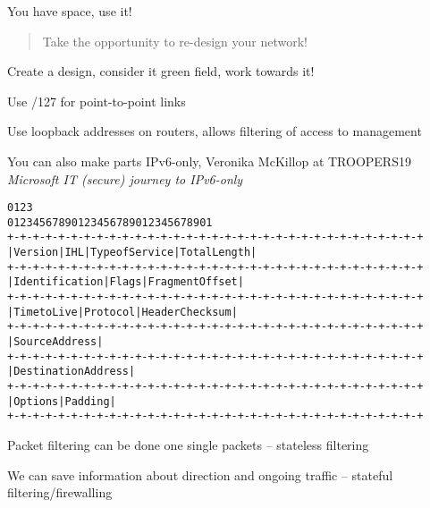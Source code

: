 \documentclass[Screen16to9,17pt]{foils}
\begin{document}
\begin{list2}
\item You have space, use it!
\end{list2}




\begin{quote}
Take the opportunity to re-design your network!
\end{quote}

\begin{list2}
\item Create a design, consider it green field, work towards it!
\item Use /127 for point-to-point links
\item Use loopback addresses on routers, allows filtering of access to management
\item You can also make parts IPv6-only, Veronika McKillop at TROOPERS19 \emph{Microsoft IT (secure) journey to IPv6-only}\\
\end{list2}



\begin{alltt}\footnotesize
0                   1                   2                   3
0 1 2 3 4 5 6 7 8 9 0 1 2 3 4 5 6 7 8 9 0 1 2 3 4 5 6 7 8 9 0 1
+-+-+-+-+-+-+-+-+-+-+-+-+-+-+-+-+-+-+-+-+-+-+-+-+-+-+-+-+-+-+-+-+
|Version|  IHL  |Type of Service|          Total Length         |
+-+-+-+-+-+-+-+-+-+-+-+-+-+-+-+-+-+-+-+-+-+-+-+-+-+-+-+-+-+-+-+-+
|         Identification        |Flags|      Fragment Offset    |
+-+-+-+-+-+-+-+-+-+-+-+-+-+-+-+-+-+-+-+-+-+-+-+-+-+-+-+-+-+-+-+-+
|  Time to Live |    Protocol   |         Header Checksum       |
+-+-+-+-+-+-+-+-+-+-+-+-+-+-+-+-+-+-+-+-+-+-+-+-+-+-+-+-+-+-+-+-+
|                       Source Address                          |
+-+-+-+-+-+-+-+-+-+-+-+-+-+-+-+-+-+-+-+-+-+-+-+-+-+-+-+-+-+-+-+-+
|                    Destination Address                        |
+-+-+-+-+-+-+-+-+-+-+-+-+-+-+-+-+-+-+-+-+-+-+-+-+-+-+-+-+-+-+-+-+
|                    Options                    |    Padding    |
+-+-+-+-+-+-+-+-+-+-+-+-+-+-+-+-+-+-+-+-+-+-+-+-+-+-+-+-+-+-+-+-+
\end{alltt}

\begin{list1}
\item Packet filtering can be done one single packets -- stateless filtering
\item We can save information about direction and ongoing traffic -- stateful filtering/firewalling
\end{list1}
\end{document}
